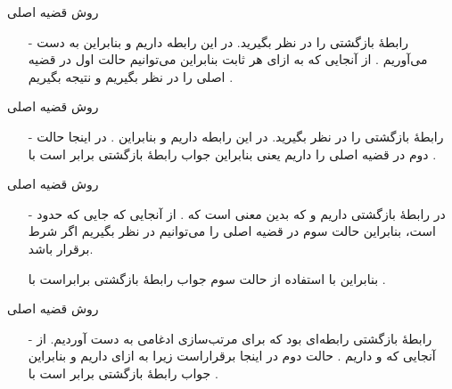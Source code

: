 \begin{frame}{‌روش قضیه اصلی}
\begin{itemize}\itemr
\item[-]
رابطهٔ بازگشتی
را در نظر بگیرید. در این رابطه داریم
و
بنابراین به دست می‌آوریم
.
از آنجایی که
به ازای هر ثابت
بنابراین می‌توانیم حالت اول در قضیه اصلی را در نظر بگیریم و نتیجه بگیریم
.
\end{itemize}
\end{frame}


\begin{frame}{‌روش قضیه اصلی}
\begin{itemize}\itemr
\item[-]
رابطهٔ بازگشتی
را در نظر بگیرید. در این رابطه داریم
و
بنابراین
.
در اینجا حالت دوم در قضیه اصلی را داریم یعنی
بنابراین جواب رابطهٔ بازگشتی برابر است با
.
\end{itemize}
\end{frame}


\begin{frame}{‌روش قضیه اصلی}
\begin{itemize}\itemr
\item[-]
در رابطهٔ بازگشتی
داریم
و
که بدین معنی است که
.
از آنجایی که
جایی که
\m{\epsilon}
حدود
است، بنابراین حالت سوم در قضیه اصلی را می‌توانیم در نظر بگیریم اگر شرط
برقرار باشد.
\begin{flushleft}
\end{flushleft}
بنابراین با استفاده از حالت سوم جواب رابطهٔ بازگشتی برابراست با
.
\end{itemize}
\end{frame}


\begin{frame}{‌روش قضیه اصلی}
\begin{itemize}\itemr
\item[-]
رابطهٔ بازگشتی
رابطه‌ای بود که برای مرتب‌سازی ادغامی به دست آوردیم. از آنجایی که
و
داریم
.
حالت دوم در اینجا برقراراست زیرا به ازای
داریم
و بنابراین جواب رابطهٔ بازگشتی برابر است با
.
\end{itemize}
\end{frame}


